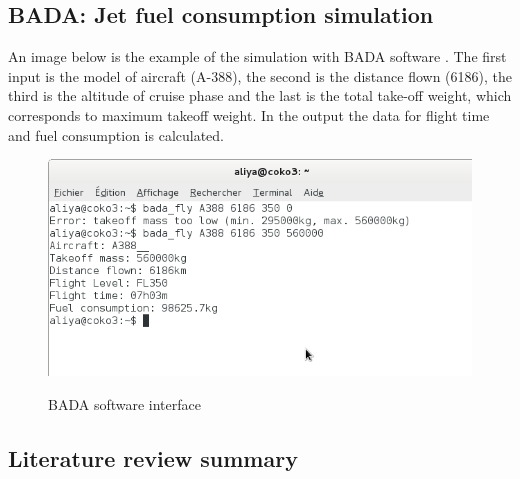 \documentclass[titlepage, 11pt]{article}
\begin{document}
\begin{appendices}
\subsection{BADA: Jet fuel consumption simulation}\label{BADA appendix}
An image below is the example of the simulation with BADA software \cite{BADA}. The first input is the model of aircraft (A-388), the second is the distance flown (6186), the third is the altitude of cruise phase and the last is the total take-off weight, which corresponds to maximum takeoff weight. In the output the data for flight time and fuel consumption is calculated. 
\begin{figure}[h!]
\centering
\caption{BADA software interface}
 \includegraphics[width=150mm,scale=1]{Cap2.png}\\
\end{figure}
\newpage
\subsection{Literature review summary}


\end{appendices}
\end{document}
